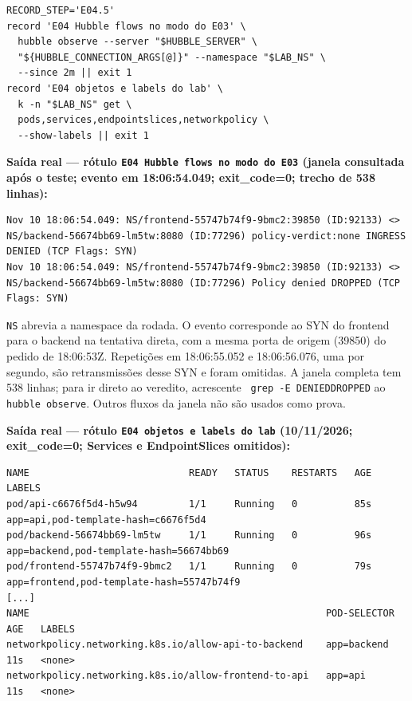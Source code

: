 \documentclass[12pt,openany,oneside,a4paper,chapter=TITLE,english,brazil]{abntex2}
\begin{document}
\begin{verbatim}
RECORD_STEP='E04.5'
record 'E04 Hubble flows no modo do E03' \
  hubble observe --server "$HUBBLE_SERVER" \
  "${HUBBLE_CONNECTION_ARGS[@]}" --namespace "$LAB_NS" \
  --since 2m || exit 1
record 'E04 objetos e labels do lab' \
  k -n "$LAB_NS" get \
  pods,services,endpointslices,networkpolicy \
  --show-labels || exit 1
\end{verbatim}

\textbf{Saída real --- rótulo \texttt{E04 Hubble flows no modo do E03} (janela consultada após o teste; evento em 18:06:54.049; exit\_code=0; trecho de 538 linhas):}

\begin{verbatim}
Nov 10 18:06:54.049: NS/frontend-55747b74f9-9bmc2:39850 (ID:92133) <> NS/backend-56674bb69-lm5tw:8080 (ID:77296) policy-verdict:none INGRESS DENIED (TCP Flags: SYN)
Nov 10 18:06:54.049: NS/frontend-55747b74f9-9bmc2:39850 (ID:92133) <> NS/backend-56674bb69-lm5tw:8080 (ID:77296) Policy denied DROPPED (TCP Flags: SYN)
\end{verbatim}

\texttt{NS} abrevia a namespace da rodada. O evento corresponde ao SYN do frontend para o backend na tentativa direta, com a mesma porta de origem (39850) do pedido de 18:06:53Z. Repetições em 18:06:55.052 e 18:06:56.076, uma por segundo, são retransmissões desse SYN e foram omitidas. A janela completa tem 538 linhas; para ir direto ao veredito, acrescente \texttt{\textbar{}\allowbreak{} grep -{}\allowbreak{}E \textquotesingle{}DENIED\textbar{}\allowbreak{}DROPPED\textquotesingle{}} ao \texttt{hubble observe}. Outros fluxos da janela não são usados como prova.

\clearpage

\textbf{Saída real --- rótulo \texttt{E04 objetos e labels do lab} (10/11/2026; exit\_code=0; Services e EndpointSlices omitidos):}

\begin{verbatim}
NAME                            READY   STATUS    RESTARTS   AGE   LABELS
pod/api-c6676f5d4-h5w94         1/1     Running   0          85s   app=api,pod-template-hash=c6676f5d4
pod/backend-56674bb69-lm5tw     1/1     Running   0          96s   app=backend,pod-template-hash=56674bb69
pod/frontend-55747b74f9-9bmc2   1/1     Running   0          79s   app=frontend,pod-template-hash=55747b74f9
[...]
NAME                                                    POD-SELECTOR   AGE   LABELS
networkpolicy.networking.k8s.io/allow-api-to-backend    app=backend    11s   <none>
networkpolicy.networking.k8s.io/allow-frontend-to-api   app=api        11s   <none>
\end{verbatim}
\end{document}
